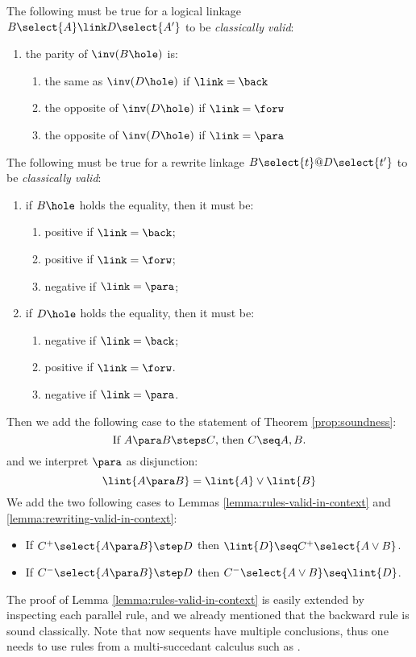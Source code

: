 \begin{condition}\label{cond:pol-classical}
  
  The following must be true for a logical linkage $B\select{A}\link
  D\select{A'}$ to be \emph{classically valid}:
  \begin{enumerate}
    \item the parity of $\inv(B\hole)$ is:
      \begin{enumerate}
        \item the same as $\inv(D\hole)$ if $\link = \back$
        \item the opposite of $\inv(D\hole)$ if $\link = \forw$
        \item the opposite of $\inv(D\hole)$ if $\link = \para$
      \end{enumerate}\label{clause:opposite}
  \end{enumerate}

  The following must be true for a rewrite linkage $B\select{t} @ D\select{t'}$
  to be \emph{classically valid}:
  \begin{enumerate}
    \item if $B\hole$ holds the equality, then it must be:
      \begin{enumerate}
        \item positive if $\link = \back$;
        \item positive if $\link = \forw$;
        \item negative if $\link = \para$;
      \end{enumerate}
    \item if $D\hole$ holds the equality, then it must be:
      \begin{enumerate} 
        \item negative if $\link = \back$;
        \item positive if $\link = \forw$.
        \item negative if $\link = \para$.
      \end{enumerate}
  \end{enumerate}
\end{condition}

Then we add the following case to the statement of Theorem \ref{prop:soundness}:
  $$\text{If $A \para B \steps C$, then $C \seq A, B$.}$$
and we interpret $\para$ as disjunction:
  $$\lint{A \para B} = \lint{A} \lor \lint{B}$$
We add the two following cases to Lemmas \ref{lemma:rules-valid-in-context} and
\ref{lemma:rewriting-valid-in-context}:
\begin{itemize}
  \item If $C^+\select{A\para B}\step D$ then $\lint{D} \seq C^+\select{A\lor B}$.
  \item If $C^-\select{A\para B}\step D$ then $C^-\select{A\lor B}\seq \lint{D}$.
\end{itemize}
The proof of Lemma \ref{lemma:rules-valid-in-context} is easily extended by
inspecting each parallel rule, and we already mentioned that the backward rule
{} is sound classically. Note that now sequents have multiple
conclusions, thus one needs to use rules from a multi-succedant calculus such as
 \cite{negri_structural_2001}.

